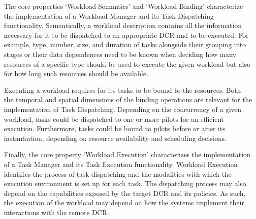 \documentclass{sig-alternate}
\begin{document}


The core properties `Workload Semantics' and `Workload Binding' characterize the
implementation of a Workload Manager and its Task Dispatching functionality.
Semantically, a workload description contains all the information necessary for
it to be dispatched to an appropriate DCR and to be executed. For example, type,
number, size, and duration of tasks alongside their grouping into stages or
their data dependences need to be known when deciding how many resources of a
specific type should be used to execute the given workload but also for how long
such resources should be available.

Executing a workload requires for its tasks to be bound to the resources. Both
the temporal and spatial dimensions of the binding operations are relevant for
the implementation of Task Dispatching. Depending on the concurrency of a given
workload, tasks could be dispatched to one or more pilots for an efficient
execution. Furthermore, tasks could be bound to pilots before or after its
instantiation, depending on resource availability and scheduling decisions.

Finally, the core property `Workload Execution' characterizes the implementation
of a Task Manager and its Task Execution functionality. Workload Execution
identifies the process of task dispatching and the modalities with which the
execution environment is set up for each task. The dispatching process may also
depend on the capabilities exposed by the target DCR and its policies. As such,
the execution of the workload may depend on how the \pilot systems implement
their interactions with the remote DCR.

\end{document}
